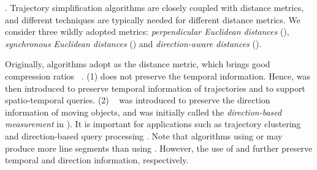 . Trajectory simplification algorithms are closely coupled with distance metrics, and different techniques are typically needed for different distance metrics.  We consider three wildly adopted metrics: \emph{perpendicular Euclidean distances} (\ped), \emph{synchronous Euclidean distances} (\sed) and \emph{direction-aware distances} (\dad).


Originally, \lsa algorithms adopt \ped as the distance metric, which brings good compression ratios~ \cite{Douglas:Peucker, Hershberger:Speeding, Liu:BQS, Muckell:Compression, Chen:Trajectory, Cao:Spatio, Shi:Survey}. (1) \ped does not preserve the temporal information. Hence, \sed was then introduced to preserve temporal information of trajectories and to support spatio-temporal queries\cite{Meratnia:Spatiotemporal}.
(2) \dad~\cite{Long:Direction, Zhang:Evaluation} was  introduced to preserve the direction information of moving objects, and was initially called the \emph{direction-based measurement} in \cite{Long:Direction}). It is important for applications such as trajectory clustering and direction-based query processing \cite{Long:Direction,Long:Mining}.
%
Note that \lsa algorithms using \sed or \dad may produce more line segments than using \ped. However, the use of \sed and \dad further preserve temporal and direction information, respectively.





